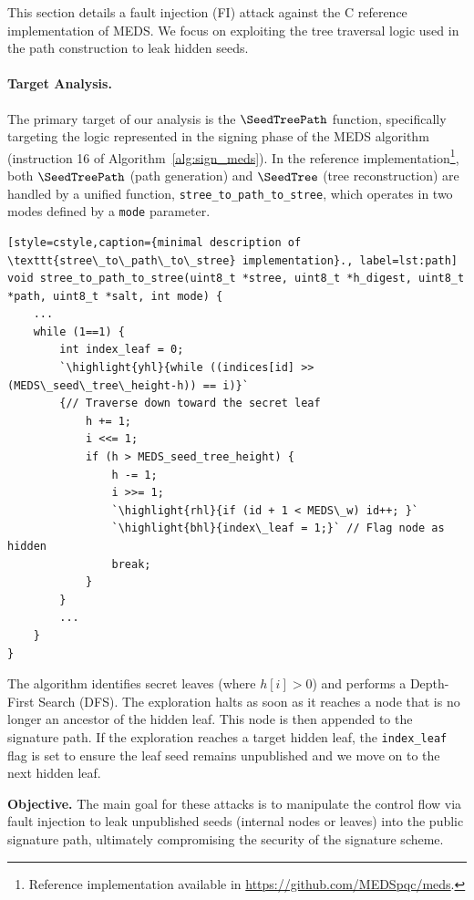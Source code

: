 This section details a fault injection (FI) attack against 
the C reference implementation of MEDS. We focus on 
exploiting the tree traversal logic used in the path construction to leak 
hidden seeds.

\paragraph{Target Analysis.}
The primary target of our analysis is the $\SeedTreePath$ function, 
specifically targeting the logic represented in the signing phase of 
the MEDS algorithm (instruction 16 of Algorithm~\ref{alg:sign_meds}). 
In the reference implementation\footnote{Reference implementation 
available in \url{https://github.com/MEDSpqc/meds}.}, both $\SeedTreePath$ 
(path generation) and $\SeedTree$ (tree reconstruction) are handled by a unified function, 
\texttt{stree\_to\_path\_to\_stree}, which operates in two modes defined 
by a \texttt{mode} parameter.

\begin{lstlisting}[style=cstyle,caption={minimal description of \texttt{stree\_to\_path\_to\_stree} implementation}., label=lst:path]
void stree_to_path_to_stree(uint8_t *stree, uint8_t *h_digest, uint8_t *path, uint8_t *salt, int mode) {
    ...
    while (1==1) {
        int index_leaf = 0;
        `\highlight{yhl}{while ((indices[id] >> (MEDS\_seed\_tree\_height-h)) == i)}` 
        {// Traverse down toward the secret leaf
            h += 1;
            i <<= 1;
            if (h > MEDS_seed_tree_height) {
                h -= 1;
                i >>= 1;
                `\highlight{rhl}{if (id + 1 < MEDS\_w) id++; }`
                `\highlight{bhl}{index\_leaf = 1;}` // Flag node as hidden
                break;
            }
        }
        ...
    }
}
\end{lstlisting}

The algorithm identifies secret leaves (where $h[i] > 0$) and performs a Depth-First Search (DFS). The exploration halts as soon as it reaches a node that is no longer an ancestor of the hidden leaf. This node is then appended to the signature path. If the exploration reaches a target hidden leaf, the \texttt{index\_leaf} flag is set to ensure the leaf seed remains unpublished and we move on to the next hidden leaf.

\noindent\textbf{Objective.}
The main goal for these attacks is to manipulate the control flow 
via fault injection to leak unpublished seeds (internal nodes or leaves) 
into the public signature path, ultimately compromising the security 
of the signature scheme.


